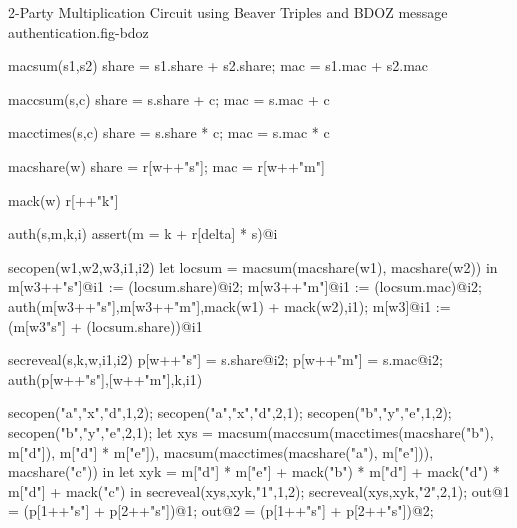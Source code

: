 \begin{fpfig}[t]{2-Party Multiplication Circuit using Beaver Triples and BDOZ message authentication.}{fig-bdoz}
{\footnotesize
  \begin{verbatimtab}
    macsum(s1,s2)
    { { share = s1.share + s2.share; mac = s1.mac + s2.mac } }
    
    maccsum(s,c)
    { { share = s.share + c; mac = s.mac + c } }
    
    macctimes(s,c)
    { { share = s.share * c; mac = s.mac * c } }
    
    macshare(w) { {  share = r[w++"s"]; mac = r[w++"m"] } }

    mack(w) { r[++"k"] }
    
    auth(s,m,k,i) { assert(m = k + r[delta] * s)@i }
    
    secopen(w1,w2,w3,i1,i2)
    {
      let locsum =  macsum(macshare(w1), macshare(w2)) in
      m[w3++"s"]@i1 := (locsum.share)@i2;
      m[w3++"m"]@i1 := (locsum.mac)@i2;
      auth(m[w3++"s"],m[w3++"m"],mack(w1) + mack(w2),i1);
      m[w3]@i1 := (m[w3"s"] + (locsum.share))@i1
    }

    secreveal(s,k,w,i1,i2)
    {
      p[w++"s"] = s.share@i2;
      p[w++"m"] = s.mac@i2;
      auth(p[w++"s"],[w++"m"],k,i1)    
    }

    secopen("a","x","d",1,2);
    secopen("a","x","d",2,1);
    secopen("b","y","e",1,2);
    secopen("b","y","e",2,1);
    let xys =
      macsum(maccsum(macctimes(macshare("b"), m["d"]), m["d"] * m["e"]),
            macsum(macctimes(macshare("a"), m["e"])), macshare("c")) 
    in 
    let xyk =
       m["d"] * m["e"] + mack("b") * m["d"] + mack("d") * m["d"] + mack("c")
    in
    secreveal(xys,xyk,"1",1,2);
    secreveal(xys,xyk,"2",2,1);
    out@1 = (p[1++"s"] + p[2++"s"])@1;
    out@2 = (p[1++"s"] + p[2++"s"])@2;
  \end{verbatimtab}
}
\end{fpfig}

    
